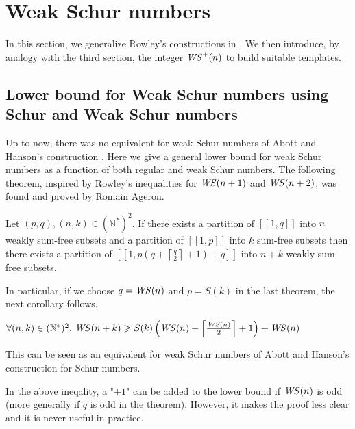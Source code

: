 \section{Weak Schur numbers}

In this section, we generalize Rowley's constructions in \cite{RowleyWS}. We then introduce, by analogy with the third
section, the
integer \(\mathit{WS}^+(n)\)
to build suitable templates.

\subsection{Lower bound for Weak Schur numbers using Schur and Weak Schur numbers}

Up to now, there was no equivalent for weak Schur numbers of Abott and Hanson's construction \cite{AbbottHanson}. Here
we
give a general lower bound for weak Schur numbers as a function of both regular and weak Schur numbers.
The following theorem, inspired by Rowley's inequalities for \(\mathit{WS} (n+1)\) and \(\mathit{WS} (n+2)\), was found and proved
by Romain Ageron.

\begin{theorem}
Let \((p,q), (n,k) \in (\mathbb{N}^*)^2\). If there exists a partition of \([\![1,q]\!]\) into \(n\) weakly sum-free
subsets and a partition of \([\![1,p]\!]\) into \(k\) sum-free
subsets then there exists a partition of \([\![1,p(q+\left \lceil \frac{q}{2} \right \rceil + 1)+q]\!]\) into \(n+k\)
weakly sum-free subsets.
\end{theorem}

In particular, if we choose \(q = \mathit{WS} (n)\) and \(p = S(k)\) in the last theorem, the next corollary follows.

\begin{corollary}
\( \forall (n,k) \in (\mathbb{N}^*)^2 \text{, } \mathit{WS} (n+k) \geqslant S(k) \left (\mathit{WS} (n) + \left \lceil \frac{\mathit{WS} (n)}{2}
\right \rceil +1 \right) + \mathit{WS} (n)\)
\end{corollary}

\begin{remark}
This can be seen as an equivalent for weak Schur numbers of Abott and Hanson's construction for Schur numbers.
\end{remark}

\begin{remark}
In the above ineqality, a "\(+1\)" can be added to the lower bound if \(\mathit{WS} (n)\) is odd (more generally if \(q\) is 
odd in the theorem). However, it makes the proof less clear and it is never useful in practice.
\end{remark}

